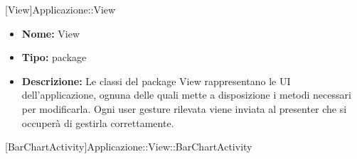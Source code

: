 			
			[View]{Applicazione::View}
			

	

			\begin{itemize}
			\item \textbf{Nome:} View
			\item \textbf{Tipo:} package
			
			\item \textbf{Descrizione:} Le classi del package View rappresentano le UI dell'applicazione, ognuna delle quali mette a disposizione i metodi necessari per modificarla. Ogni user gesture rilevata viene inviata al presenter che si occuperà di gestirla correttamente. 
			\end{itemize}

			
			[BarChartActivity]{Applicazione::View::BarChartActivity}
			

	
